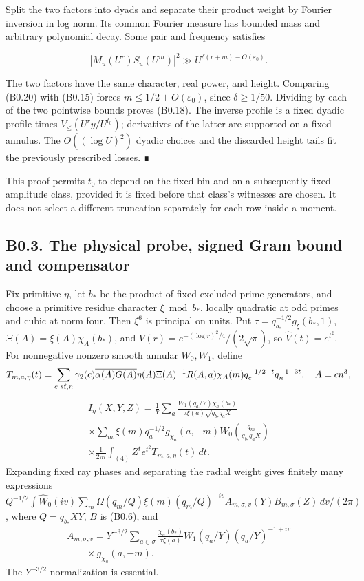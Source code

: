 \documentclass[11pt,a4paper]{article}
\begin{document}
Split the two factors into dyads and separate their product weight by
Fourier inversion in log norm. Its common Fourier measure has bounded
mass and arbitrary polynomial decay. Some pair and frequency satisfies

\[
|M_u(U^r)S_u(U^m)|^2
\gg U^{\delta(r+m)-O(\varepsilon_0)}.
\tag{B0.20}
\]

The two factors have the same character, real power, and height.
Comparing (B0.20) with (B0.15) forces \(m\le1/2+O(\varepsilon_0)\),
since \(\delta\ge1/50\). Dividing by each of the two pointwise bounds
proves (B0.18). The inverse profile is a fixed dyadic profile times
\(V_\le(U^r y/U^{t_0})\); derivatives of the latter are supported on a
fixed annulus. The \(O((\log U)^2)\) dyadic choices and the discarded
height tails fit the previously prescribed losses. ∎

This proof permits \(t_0\) to depend on the fixed bin and on a
subsequently fixed amplitude class, provided it is fixed before that
class's witnesses are chosen. It does not select a different truncation
separately for each row inside a moment.

\hypertarget{b0.3.-the-physical-probe-signed-gram-bound-and-compensator}{%
\subsection{B0.3. The physical probe, signed Gram bound and
compensator}\label{b0.3.-the-physical-probe-signed-gram-bound-and-compensator}}

Fix primitive \(\eta\), let \(b_*\) be the product of fixed excluded
prime generators, and choose a primitive residue character
\(\xi\bmod b_*\), locally quadratic at odd primes and cubic at norm
four. Then \(\xi^6\) is principal on units. Put
\(\tau=q_{b_*}^{-1/2}g_\xi(b_*,\allowbreak{}1)\), \(\Xi(A)=\xi(A)\chi_A(b_*)\), and
\(V(r)=e^{-(\log r)^2/4}/(2\sqrt\pi)\), so \(\widehat V(t)=e^{t^2}\).
For nonnegative nonzero smooth annular \(W_0,\allowbreak{}W_1\), define \[
T_{m,a,\eta}(t)=\sum_{c\ {\rm sf},n}
\gamma_2(c)\overline{\alpha(A)G(A)}\eta(A)\Xi(A)^{-1}
R(A,a)\chi_A(m)q_c^{-1/2-t}q_n^{-1-3t},\quad A=cn^3,
\] \[
\begin{gathered}
I_\eta(X,Y,Z)=\frac1Y\sum_a
\frac{W_1(q_a/Y)\chi_a(b_*)}{\tau\xi(a)\sqrt{q_{b_*}q_aX}}\\
\times\sum_m\xi(m)q_a^{-1/2}g_{\chi_a}(a,-m)
W_0\!\left(\frac{q_m}{q_{b_*}q_aX}\right)\\
\times\frac1{2\pi i}\int_{(4)}Z^te^{t^2}T_{m,a,\eta}(t)\,dt.
\end{gathered}
\tag{B0.21}
\] Expanding fixed ray phases and separating the radial weight gives
finitely many expressions
\(Q^{-1/2}\int\widehat W_0(iv)\sum_m\Omega(q_m/Q)\xi(m)(q_m/Q)^{-iv}A_{m,\allowbreak{}\sigma,\allowbreak{}v}(Y)B_{m,\allowbreak{}\sigma}(Z)\,\allowbreak{}dv/(2\pi)\),
where \(Q=q_{b_*}XY\), \(B\) is (B0.6), and \[
\begin{gathered}
A_{m,\sigma,v}=Y^{-3/2}\sum_{a\in\sigma}
\frac{\chi_a(b_*)}{\tau\xi(a)}W_1(q_a/Y)(q_a/Y)^{-1+iv}\\ \qquad{}\times g_{\chi_a}(a,-m).
\end{gathered}
\] The \(Y^{-3/2}\) normalization is essential.
\end{document}
